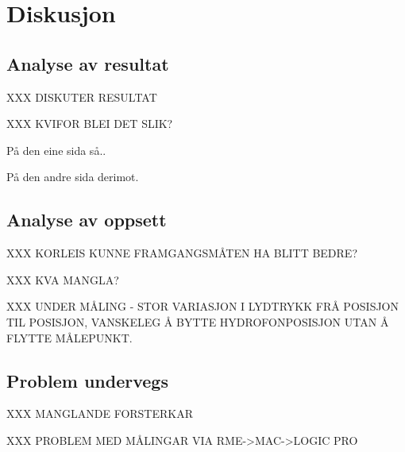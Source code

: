 \section{Diskusjon}
\subsection{Analyse av resultat}
XXX DISKUTER RESULTAT

XXX KVIFOR BLEI DET SLIK?

På den eine sida så..

På den andre sida derimot.

\subsection{Analyse av oppsett}
XXX KORLEIS KUNNE FRAMGANGSMÅTEN HA BLITT BEDRE?

XXX KVA MANGLA?

XXX UNDER MÅLING - STOR VARIASJON I LYDTRYKK FRÅ POSISJON TIL POSISJON, VANSKELEG Å BYTTE HYDROFONPOSISJON UTAN Å FLYTTE MÅLEPUNKT.

\subsection{Problem undervegs}

XXX MANGLANDE FORSTERKAR

XXX PROBLEM MED MÅLINGAR VIA RME->MAC->LOGIC PRO